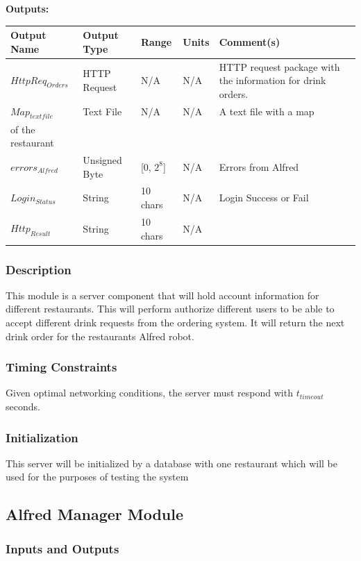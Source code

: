 \documentclass [10pt]{article}
\begin{document}
\textbf{Outputs: } 
\begin{longtable}{|l|l|l|l|l|}\hline 
	\rowcolor{tableCell}Output Name & Output Type & Range & Units & Comment(s) \\ \hline
	$ HttpReq_{Orders} $ & HTTP Request & N/A & N/A & HTTP request package with the information for drink orders. \\ \hline
	$ Map_{textfile} $ & Text File & N/A & N/A & A text file with a map \\ of the restaurant \\ \hline
	$  errors_{Alfred} $ & Unsigned Byte & [0, $2^{8}$]& N/A & Errors from Alfred \\ \hline
	$  Login_{Status} $ & String & 10 chars & N/A & Login Success or Fail \\ \hline
	$  Http_{Result} $ & String & 10 chars & N/A & \\ \hline
\end{longtable}

\subsubsection{Description}
This module is a server component that will hold account information for different restaurants. This will perform authorize different users to be able to accept different drink requests from the ordering system. It will return the next drink order for the restaurants Alfred robot.
\subsubsection{Timing Constraints}
Given optimal networking conditions, the server must respond with  $ t_{timeout} $ seconds.

\subsubsection{Initialization}
This server will be initialized by a database with one restaurant which will be used for the purposes of testing the system

\subsection{Alfred Manager Module}

\subsubsection{Inputs and Outputs}
\end{document}
